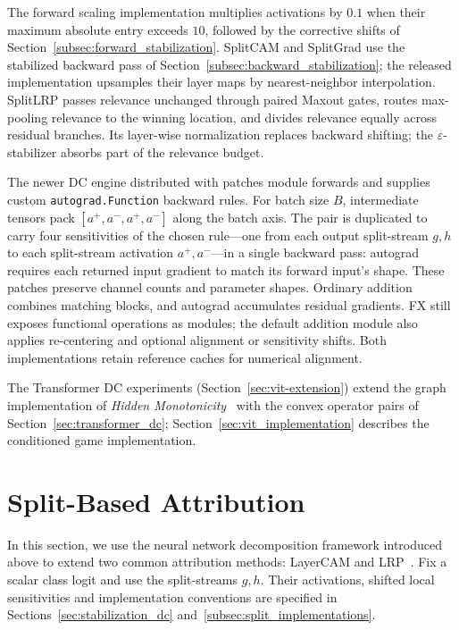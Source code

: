 The forward scaling implementation multiplies activations by $0.1$ when their maximum absolute entry exceeds $10$, followed by the corrective shifts of Section~\ref{subsec:forward_stabilization}. SplitCAM and SplitGrad use the stabilized backward pass of Section~\ref{subsec:backward_stabilization}; the released implementation upsamples their layer maps by nearest-neighbor interpolation. SplitLRP passes relevance unchanged through paired Maxout gates, routes max-pooling relevance to the winning location, and divides relevance equally across residual branches. Its layer-wise normalization replaces backward shifting; the $\varepsilon$-stabilizer absorbs part of the relevance budget.

The newer DC engine distributed with \textcite{playingBackward2026} patches module forwards and supplies custom \texttt{autograd.Function} backward rules. For batch size $B$, intermediate tensors pack $[a^+,a^-,a^+,a^-]$ along the batch axis. The pair is duplicated to carry four sensitivities of the chosen rule---one from each output split-stream $g,h$ to each split-stream activation $a^+,a^-$---in a single backward pass: autograd requires each returned input gradient to match its forward input's shape. These patches preserve channel counts and parameter shapes. Ordinary addition combines matching blocks, and autograd accumulates residual gradients. FX still exposes functional operations as modules; the default addition module also applies re-centering and optional alignment or sensitivity shifts. Both implementations retain reference caches for numerical alignment.

The Transformer DC experiments (Section~\ref{sec:vit-extension}) extend the graph implementation of \emph{Hidden Monotonicity}~\parencite{hiddenMono} with the convex operator pairs of Section~\ref{sec:transformer_dc}; Section~\ref{sec:vit_implementation} describes the conditioned game implementation.

\section{Split-Based Attribution}\label{sec:split_attribution_concept}

In this section, we use the neural network decomposition framework introduced above to extend two common attribution methods: LayerCAM and LRP~\parencite{hiddenMono}. Fix a scalar class logit and use the split-streams $g,h$. Their activations, shifted local sensitivities and implementation conventions are specified in Sections~\ref{sec:stabilization_dc} and~\ref{subsec:split_implementations}.

